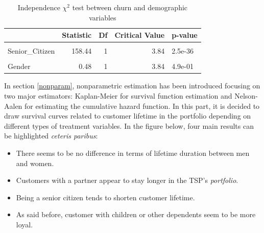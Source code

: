 \documentclass[
]{book}
\providecommand{\tightlist}{%
  \setlength{\itemsep}{0pt}\setlength{\parskip}{0pt}}
\begin{document}
\begin{table}[H]

\caption{\label{tab:chi2demographics}Independence $\chi^2$ test between churn and demographic variables}
\centering
\begin{tabular}[t]{lrrrl}
\toprule
  & Statistic & Df & Critical Value & p-value\\
\midrule
\cellcolor{gray!6}{Dependents} & \cellcolor{gray!6}{431.65} & \cellcolor{gray!6}{1} & \cellcolor{gray!6}{3.84} & \cellcolor{gray!6}{7.1e-96}\\
Senior\_Citizen & 158.44 & 1 & 3.84 & 2.5e-36\\
\cellcolor{gray!6}{Partner} & \cellcolor{gray!6}{157.50} & \cellcolor{gray!6}{1} & \cellcolor{gray!6}{3.84} & \cellcolor{gray!6}{4e-36}\\
Gender & 0.48 & 1 & 3.84 & 4.9e-01\\
\bottomrule
\end{tabular}
\end{table}

In section \ref{nonparam}, nonparametric estimation has been introduced focusing on two major estimators: Kaplan-Meier for survival function estimation and Nelson-Aalen for estimating the cumulative hazard function. In this part, it is decided to draw survival curves related to customer lifetime in the portfolio depending on different types of treatment variables. In the figure below, four main results can be highlighted \emph{ceteris paribus}:

\begin{itemize}
\tightlist
\item
  There seems to be no difference in terms of lifetime duration between men and women.
\item
  Customers with a partner appear to stay longer in the TSP's \emph{portfolio}.
\item
  Being a senior citizen tends to shorten customer lifetime.
\item
  As said before, customer with children or other dependents seem to be more loyal.
\end{itemize}
\end{document}
